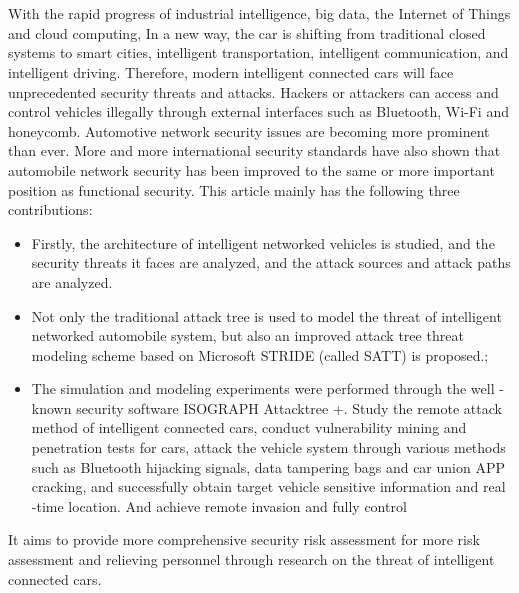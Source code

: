 \newpage
\vspace{-1cm}
\chapter*{\xiaosan {}}
\vspace{-0.5cm}
\hspace{-0.5cm}
With the rapid progress of industrial intelligence, big data, the Internet of Things and cloud computing,
In a new way, the car is shifting from traditional closed systems to smart cities, intelligent transportation, intelligent communication, and intelligent driving. Therefore, modern intelligent connected cars will face unprecedented security threats and attacks. Hackers or attackers can access and control vehicles illegally through external interfaces such as Bluetooth, Wi-Fi and honeycomb. Automotive network security issues are becoming more prominent than ever. More and more international security standards have also shown that automobile network security has been improved to the same or more important position as functional security. This article mainly has the following three contributions:
\begin{itemize}
    \item Firstly, the architecture of intelligent networked vehicles is studied, and the security threats it faces are analyzed, and the attack sources and attack paths are analyzed.
    \item Not only the traditional attack tree is used to model the threat of intelligent networked automobile system, but also an improved attack tree threat modeling scheme based on Microsoft STRIDE (called SATT) is proposed.;
    \item The simulation and modeling experiments were performed through the well -known security software ISOGRAPH Attacktree +. Study the remote attack method of intelligent connected cars, conduct vulnerability mining and penetration tests for cars, attack the vehicle system through various methods such as Bluetooth hijacking signals, data tampering bags and car union APP cracking, and successfully obtain target vehicle sensitive information and real -time location.  And achieve remote invasion and fully control
  \end{itemize}
  It aims to provide more comprehensive security risk assessment for more risk assessment and relieving personnel through research on the threat of intelligent connected cars.
